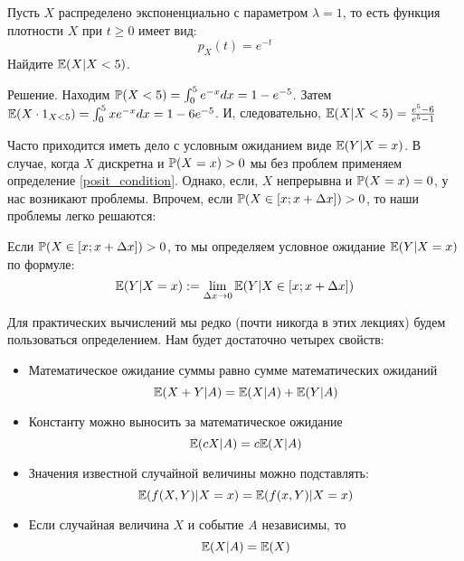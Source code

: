 \begin{myex} Пусть $ X $ распределено экспоненциально с параметром $ \lambda=1 $, то есть функция плотности $ X $ при $ t\geq 0 $ имеет вид:
\[ p_{X}(t)=e^{-t} \]
Найдите $ \E(X|X<5) $.

Решение. Находим $ \P(X<5)=\int_{0}^{5}e^{-x}dx=1-e^{-5} $. Затем $ \E(X\cdot 1_{X<5})=\int_{0}^{5} xe^{-x}dx=1-6e^{-5} $. И, следовательно, $ \E(X|X<5)=\frac{e^{5}-6}{e^{5}-1} $

\end{myex}


Часто приходится иметь дело с условным ожиданием виде $ \E(Y|X=x) $. В случае, когда $ X $ дискретна и $ \P(X=x)>0 $ мы без проблем применяем определение \ref{posit_condition}. Однако, если, $ X $ непрерывна и $ \P(X=x)=0 $, у нас возникают проблемы. Впрочем, если $ \P(X\in [x;x+\Delta x])>0$, то наши проблемы легко решаются:
\begin{mydef}
Если $ \P(X\in [x;x+\Delta x])>0 $, то мы определяем условное ожидание $ \E(Y|X=x) $ по формуле:
\begin{equation}
\E(Y|X=x):=\lim_{\Delta x\to 0}\E(Y|X\in [x;x+\Delta x])
\end{equation}
\end{mydef}

Для практических вычислений мы редко (почти никогда в этих лекциях) будем пользоваться определением. Нам будет достаточно четырех свойств:

\begin{itemize}
\item Математическое ожидание суммы равно сумме математических ожиданий
\begin{equation}
\E(X+Y|A)=\E(X|A)+\E(Y|A)
\end{equation}
\item Константу можно выносить за математическое ожидание
\begin{equation}
\E(cX|A)=c\E(X|A)
\end{equation}
\item Значения известной случайной величины можно подставлять:
\begin{equation}
\E(f(X,Y)|X=x)=\E(f(x,Y)|X=x)
\end{equation}
\item Если случайная величина $ X $ и событие $ A $ независимы, то
\begin{equation}
\E(X|A)=\E(X)
\end{equation}

\end{itemize}

